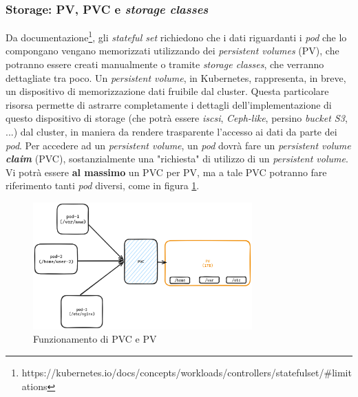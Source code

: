 \subsubsection{Storage: PV, PVC e \textit{storage classes}}
Da documentazione\footnote{https://kubernetes.io/docs/concepts/workloads/controllers/statefulset/#limitations}, gli \textit{stateful set} richiedono che i dati riguardanti i \textit{pod} che lo compongano vengano memorizzati utilizzando dei \textit{persistent volumes} (PV), che potranno essere creati manualmente o tramite \textit{storage classes}, che verranno dettagliate tra poco.
\newline
Un \textit{persistent volume}, in Kubernetes, rappresenta, in breve, un dispositivo di memorizzazione dati fruibile dal cluster. Questa particolare risorsa permette di astrarre completamente i dettagli dell'implementazione di questo dispositivo di storage (che potrà essere \textit{iscsi}, \textit{Ceph-like}, persino \textit{bucket S3}, ...) dal cluster, in maniera da rendere trasparente l'accesso ai dati da parte dei \textit{pod}.
\newline
Per accedere ad un \textit{persistent volume}, un \textit{pod} dovrà fare un \textit{persistent volume \textbf{claim}} (PVC), sostanzialmente una "richiesta" di utilizzo di un \textit{persistent volume}. Vi potrà essere \textbf{al massimo} un PVC per PV, ma a tale PVC potranno fare riferimento tanti \textit{pod} diversi, come in figura \ref{fig:pvc-to-pv}.
\begin{figure}[h]
    \centering
    \includegraphics[width=0.75\textwidth]{files/images/pvc-to-pv.png}
    \caption{Funzionamento di PVC e PV}
    \label{fig:pvc-to-pv}
\end{figure}
\newline
